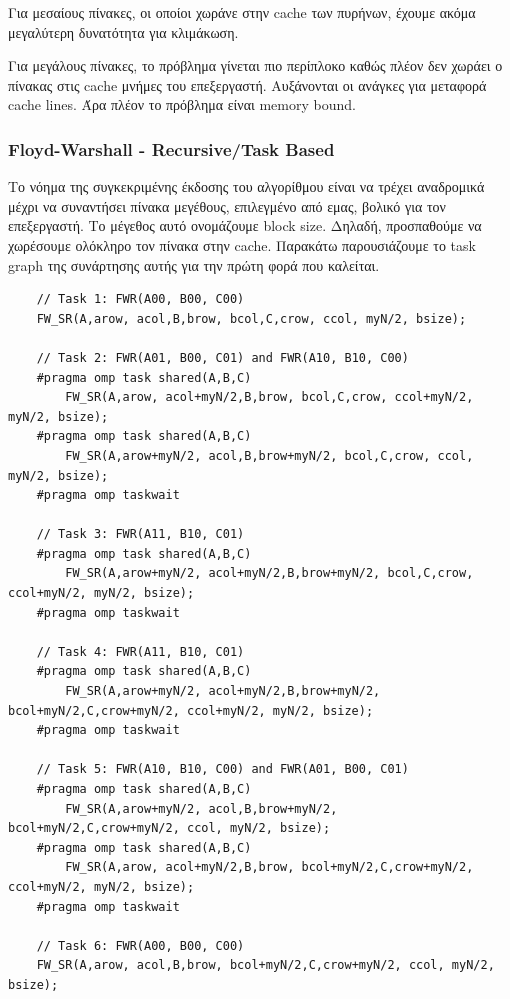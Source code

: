 \documentclass[letterpaper,12pt]{article}
\begin{document}
Για μεσαίους πίνακες, οι οποίοι χωράνε στην cache των πυρήνων, έχουμε ακόμα μεγαλύτερη δυνατότητα για κλιμάκωση.

Για μεγάλους πίνακες, το πρόβλημα γίνεται πιο περίπλοκο καθώς πλέον δεν χωράει ο πίνακας στις cache μνήμες του επεξεργαστή.
Αυξάνονται οι ανάγκες για μεταφορά cache lines. Άρα πλέον το πρόβλημα είναι memory bound. 

\subsubsection{Floyd-Warshall - Recursive/Task Based}

Το νόημα της συγκεκριμένης έκδοσης του αλγορίθμου είναι να τρέχει αναδρομικά μέχρι να συναντήσει πίνακα
μεγέθους, επιλεγμένο από εμας, βολικό για τον επεξεργαστή. Το μέγεθος αυτό ονομάζουμε block size. Δηλαδή, προσπαθούμε να χωρέσουμε ολόκληρο τον
πίνακα στην cache. Παρακάτω παρουσιάζουμε το task graph της συνάρτησης αυτής για την πρώτη φορά που καλείται.

\begin{lstlisting}
    // Task 1: FWR(A00, B00, C00)
    FW_SR(A,arow, acol,B,brow, bcol,C,crow, ccol, myN/2, bsize);
    
    // Task 2: FWR(A01, B00, C01) and FWR(A10, B10, C00)
    #pragma omp task shared(A,B,C)
        FW_SR(A,arow, acol+myN/2,B,brow, bcol,C,crow, ccol+myN/2, myN/2, bsize);
    #pragma omp task shared(A,B,C)
        FW_SR(A,arow+myN/2, acol,B,brow+myN/2, bcol,C,crow, ccol, myN/2, bsize);
    #pragma omp taskwait
    
    // Task 3: FWR(A11, B10, C01)
    #pragma omp task shared(A,B,C)
        FW_SR(A,arow+myN/2, acol+myN/2,B,brow+myN/2, bcol,C,crow, ccol+myN/2, myN/2, bsize);
    #pragma omp taskwait

    // Task 4: FWR(A11, B10, C01)
    #pragma omp task shared(A,B,C)
        FW_SR(A,arow+myN/2, acol+myN/2,B,brow+myN/2, bcol+myN/2,C,crow+myN/2, ccol+myN/2, myN/2, bsize);
    #pragma omp taskwait

    // Task 5: FWR(A10, B10, C00) and FWR(A01, B00, C01)
    #pragma omp task shared(A,B,C)
        FW_SR(A,arow+myN/2, acol,B,brow+myN/2, bcol+myN/2,C,crow+myN/2, ccol, myN/2, bsize);
    #pragma omp task shared(A,B,C)	
        FW_SR(A,arow, acol+myN/2,B,brow, bcol+myN/2,C,crow+myN/2, ccol+myN/2, myN/2, bsize);
    #pragma omp taskwait

    // Task 6: FWR(A00, B00, C00)
    FW_SR(A,arow, acol,B,brow, bcol+myN/2,C,crow+myN/2, ccol, myN/2, bsize);
\end{lstlisting}
\end{document}

